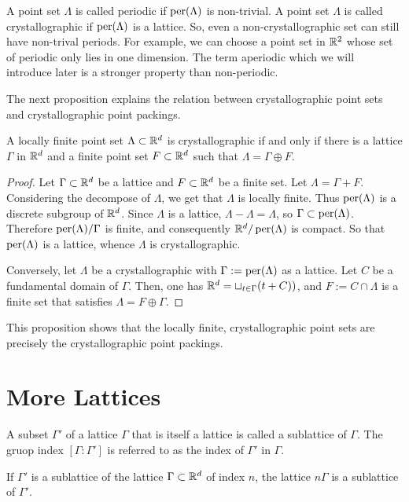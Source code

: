 \documentclass{article}
\begin{document}
A point set $\Lambda$ is called periodic if $\operatorname{per}(\Lambda)$ is non-trivial. A point set $\Lambda$ is called crystallographic if $\operatorname{per}(\Lambda)$  is a lattice. So, even a non-crystallographic set can still have non-trival periods. 
For example, we can choose a point set in $\mathbb{R}^2$ whose set of periodic only lies in one dimension. The term aperiodic which we will introduce later is a stronger property than non-periodic. 

The next proposition explains the relation between crystallographic point sets and  crystallographic point packings.

\begin{proposition}\label{prop:crystallographic}
	A locally finite point set $\Lambda\subset \mathbb{R}^d$ is crystallographic if and only if there is a lattice $\Gamma$ in $\mathbb{R}^d$ and a finite point set $F\subset \mathbb{R}^d$ such that $\Lambda=\Gamma\oplus F$.
\end{proposition}
\begin{proof}
	Let $\Gamma\subset\mathbb{R}^d$ be a lattice and $F\subset\mathbb{R}^d$ be a finite set. Let $\Lambda=\Gamma+F$. Considering the decompose of $\Lambda$, we get that $\Lambda$ is locally finite. Thus $\operatorname{per}(\Lambda)$ is a discrete subgroup of $\mathbb{R}^d$. Since $\Lambda$ is a lattice, $\Lambda-\Lambda=\Lambda$, so $\Gamma\subset\operatorname{per}(\Lambda)$. Therefore $\operatorname{per}(\Lambda)/\Gamma$ is finite, and consequently $\mathbb{R}^d/\operatorname{per}(\Lambda)$ is compact. So that $\operatorname{per}(\Lambda)$ is a lattice, whence $\Lambda$ is crystallographic. 
	
	Conversely, let $\Lambda$ be a crystallographic with $\Gamma:=\operatorname{per}(\Lambda)$ as a lattice. Let $C$ be a  fundamental domain of $\Gamma$. Then, one has $\mathbb{R}^d=\sqcup_{t\in\Gamma}(t+C))$, and $F:=C\cap\Lambda$ is a finite set that satisfies $\Lambda=F\oplus \Gamma$.
	
\end{proof}

This proposition shows that the locally finite, crystallographic point sets are precisely the crystallographic point packings.

\section{More Lattices}
A subset $\Gamma'$ of a lattice $\Gamma$ that is itself a lattice is called a sublattice of $\Gamma$. The gruop index $[\Gamma:\Gamma']$ is referred to as the index of $\Gamma'$ in $\Gamma.$
\begin{lemma}
	 If  $\Gamma'$ is a sublattice of the lattice $\Gamma\subset\mathbb{R}^d$ of index $n$, the lattice $n\Gamma$ is a sublattice of $\Gamma'$.
\end{lemma} 
\end{document}
